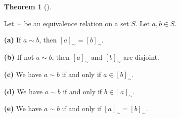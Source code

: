 \documentclass[numbers=enddot,12pt,final,onecolumn,notitlepage]{scrartcl}%
\numberwithin{exer}{subsection}
\theoremstyle{definition}
\newtheorem{theo}{Theorem}[subsection]
\newenvironment{theorem}[1][]
{\begin{theo}[#1]\begin{leftbar}}
{\end{leftbar}\end{theo}}
\begin{document}
\begin{theorem}
\label{thm.equiv.eqclas.disj}Let $\sim$ be an equivalence relation on a set
$S$. Let $a,b\in S$.

\textbf{(a)} If $a\sim b$, then $\left[  a\right]  _{\sim}=\left[  b\right]
_{\sim}$.

\textbf{(b)} If not $a\sim b$, then $\left[  a\right]  _{\sim}$ and $\left[
b\right]  _{\sim}$ are disjoint.

\textbf{(c)} We have $a\sim b$ if and only if $a\in\left[  b\right]  _{\sim}$.

\textbf{(d)} We have $a\sim b$ if and only if $b\in\left[  a\right]  _{\sim}$.

\textbf{(e)} We have $a\sim b$ if and only if $\left[  a\right]  _{\sim
}=\left[  b\right]  _{\sim}$.
\end{theorem}
\end{document}
